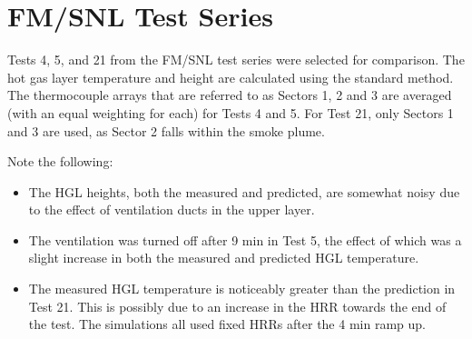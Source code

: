 \clearpage

\section{FM/SNL Test Series}

Tests 4, 5, and 21 from the FM/SNL test series were selected for comparison. The hot gas layer temperature and height are calculated using the
standard method. The thermocouple arrays that are referred to as Sectors 1, 2 and 3 are averaged (with an equal weighting for each) for Tests 4 and
5. For Test 21, only Sectors 1 and 3 are used, as Sector 2 falls within the smoke plume.

Note the following:
\begin{itemize}
\item The HGL heights, both the measured and predicted, are somewhat noisy due to the effect of ventilation ducts in the upper layer.
\item The ventilation was turned off after 9 min in Test 5,
the effect of which was a slight increase in both the measured and predicted HGL temperature.
\item The measured HGL temperature is noticeably greater than the prediction in Test 21.
This is possibly due to an increase in the HRR towards the end of the test.  The simulations all used fixed HRRs after the 4 min ramp up.
\end{itemize}

